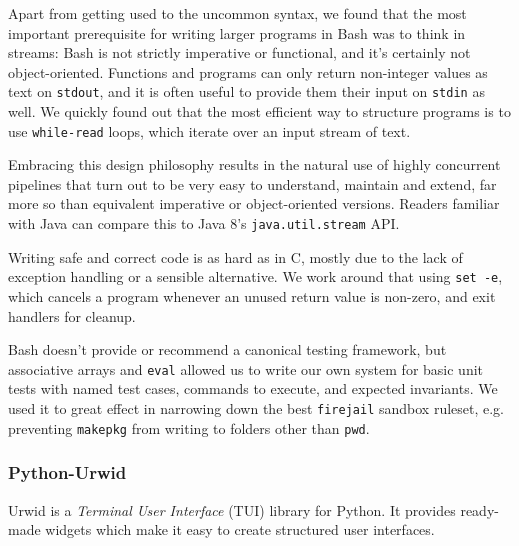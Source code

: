 Apart from getting used to the uncommon syntax, we found that the most important prerequisite for writing larger programs in Bash was to think in streams:
Bash is not strictly imperative or functional, and it's certainly not object-oriented. Functions and programs can only return non-integer values as text on \texttt{stdout}, and it is often useful to provide them their input on \texttt{stdin} as well.
We quickly found out that the most efficient way to structure programs is to use \texttt{while-read} loops, which iterate over an input stream of text.

Embracing this design philosophy results in the natural use of highly concurrent pipelines that turn out to be very easy to understand, maintain and extend, far more so than equivalent imperative or object-oriented versions.
Readers familiar with Java can compare this to Java 8's \texttt{java.util.stream} API.

Writing safe and correct code is as hard as in C, mostly due to the lack of exception handling or a sensible alternative.
We work around that using \texttt{set -e}, which cancels a program whenever an unused return value is non-zero, and exit handlers for cleanup.

Bash doesn't provide or recommend a canonical testing framework, but associative arrays and \texttt{eval} allowed us to write our own system for basic unit tests with named test cases, commands to execute, and expected invariants.
We used it to great effect in narrowing down the best \texttt{firejail} sandbox ruleset, e.g. preventing \texttt{makepkg} from writing to folders other than \texttt{pwd}.

\subsubsection*{Python-Urwid}
Urwid is a \emph{Terminal User Interface} (TUI) library for Python. It provides ready-made widgets which make it easy to create structured user interfaces.
